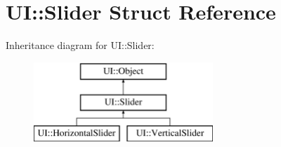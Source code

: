 \hypertarget{struct_u_i_1_1_slider}{}\section{UI\+:\+:Slider Struct Reference}
\label{struct_u_i_1_1_slider}
Inheritance diagram for UI\+:\+:Slider\+:\begin{figure}[H]
\begin{center}
\leavevmode
\includegraphics[height=3.000000cm]{struct_u_i_1_1_slider}
\end{center}
\end{figure}
